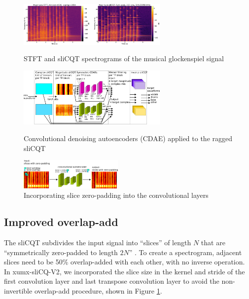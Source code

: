 \documentclass{INTERSPEECH2023}
\begin{document}
\balance
\begin{figure}[h]
  \begin{minipage}{\linewidth}
        \centering
	\includegraphics[width=0.65\textwidth]{./spectrograms_comparison.png}
	\caption{STFT and sliCQT spectrograms of the musical glockenspiel signal}
	\label{fig:spectrograms}
  \end{minipage}

  \begin{minipage}{\linewidth}
        \centering
	\includegraphics[width=0.65\textwidth]{./xumx_slicq_pertarget.png}
	\caption{Convolutional denoising autoencoders (CDAE) applied to the ragged sliCQT}
	\label{fig:ragged}
  \end{minipage}

  \begin{minipage}{\linewidth}
        \centering
        \includegraphics[width=0.45\textwidth]{./overlap.png}
	\caption{Incorporating slice zero-padding into the convolutional layers}
	\label{fig:overlap}
  \end{minipage}
\end{figure}

\subsection{Improved overlap-add}

The sliCQT subdivides the input signal into ``slices'' of length $N$ that are ``symmetrically zero-padded to length $2N$'' \cite[10]{slicq}. To create a spectrogram, adjacent slices need to be 50\% overlap-added with each other, with no inverse operation. In xumx-sliCQ-V2, we incorporated the slice size in the kernel and stride of the first convolution layer and last transpose convolution layer to avoid the non-invertible overlap-add procedure, shown in Figure \ref{fig:overlap}.
\end{document}
